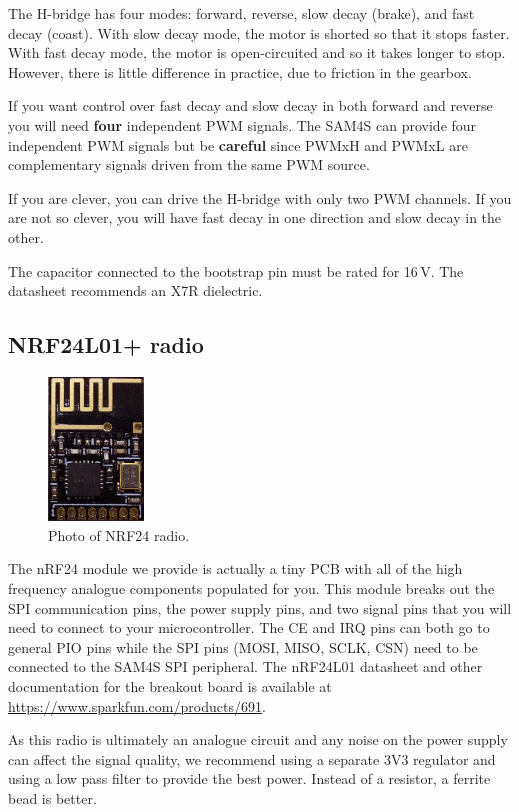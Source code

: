 The H-bridge has four modes: forward, reverse, slow decay (brake), and
fast decay (coast).  With slow decay mode, the motor is shorted so
that it stops faster.  With fast decay mode, the motor is
open-circuited and so it takes longer to stop.  However, there is
little difference in practice, due to friction in the gearbox.

If you want control over fast decay and slow decay in both forward and
reverse you will need \textbf{four} independent PWM signals. The SAM4S
can provide four independent PWM signals but be \textbf{careful} since
PWMxH and PWMxL are complementary signals driven from the same PWM
source.

If you are clever, you can drive the H-bridge with only two PWM
channels.  If you are not so clever, you will have fast decay in one
direction and slow decay in the other.

The capacitor connected to the bootstrap pin must be rated for
16\,V. The datasheet recommends an X7R dielectric.

\subsection{NRF24L01+ radio}

\begin{figure}[!h]
  \centering \includegraphics[width=1in]{figs/nrf24.jpg}
  \caption{Photo of NRF24 radio.}
  \label{fig:nrf24}
\end{figure}

The nRF24 module we provide is actually a tiny PCB with all of the high
frequency analogue components populated for you. This module breaks out
the SPI communication pins, the power supply pins, and two signal pins
that you will need to connect to your microcontroller. The CE and IRQ
pins can both go to general PIO pins while the SPI pins (MOSI, MISO,
SCLK, CSN) need to be connected to the SAM4S SPI peripheral. The
nRF24L01 datasheet and other documentation for the breakout board is
available at \url{https://www.sparkfun.com/products/691}.

As this radio is ultimately an analogue circuit and any noise on the
power supply can affect the signal quality, we recommend using a
separate 3V3 regulator and using a low pass filter to provide the best
power.  Instead of a resistor, a ferrite bead is better.


